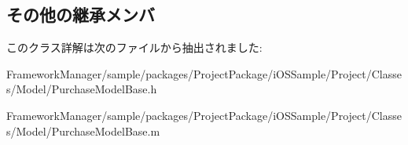 \subsection*{その他の継承メンバ}


このクラス詳解は次のファイルから抽出されました\+:\begin{DoxyCompactItemize}
\item 
Framework\+Manager/sample/packages/\+Project\+Package/i\+O\+S\+Sample/\+Project/\+Classes/\+Model/Purchase\+Model\+Base.\+h\item 
Framework\+Manager/sample/packages/\+Project\+Package/i\+O\+S\+Sample/\+Project/\+Classes/\+Model/Purchase\+Model\+Base.\+m\end{DoxyCompactItemize}
